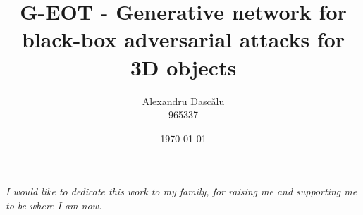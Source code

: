 \documentclass[11pt, a4paper, oneside]{custard}
\begin{document}
	
	\title{G-EOT - Generative network for black-box adversarial attacks for 3D objects}
	\author{Alexandru Dascălu\protect\\{\normalsize 965337}}
	
	
	
	\date{\today}
	
	\frontmatter%
	\maketitle
	\declaration
	\cleardoublepage
	
	\begin{vplace}[0.7]
		\begin{large}
			\begin{center}
				\textit{I would like to dedicate this work to my family, for raising me and supporting me to be where I am now.}
			\end{center}
		\end{large}
	\end{vplace}
\end{document}
